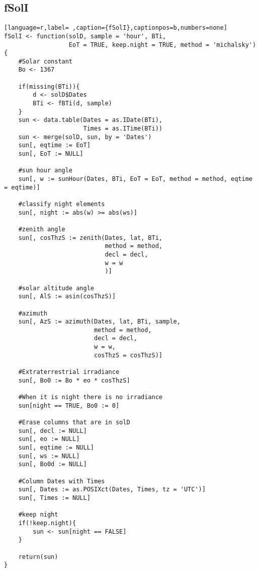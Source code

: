 \subsection{fSolI}
\label{sec:org3740b6e}
\label{subsec:fsoli}
\begin{lstlisting}[language=r,label= ,caption={fSolI},captionpos=b,numbers=none]
fSolI <- function(solD, sample = 'hour', BTi,
                  EoT = TRUE, keep.night = TRUE, method = 'michalsky')
{
    #Solar constant
    Bo <- 1367

    if(missing(BTi)){
        d <- solD$Dates
        BTi <- fBTi(d, sample)
    }
    sun <- data.table(Dates = as.IDate(BTi),
                      Times = as.ITime(BTi))
    sun <- merge(solD, sun, by = 'Dates')
    sun[, eqtime := EoT]
    sun[, EoT := NULL]

    #sun hour angle
    sun[, w := sunHour(Dates, BTi, EoT = EoT, method = method, eqtime = eqtime)]

    #classify night elements
    sun[, night := abs(w) >= abs(ws)]

    #zenith angle
    sun[, cosThzS := zenith(Dates, lat, BTi,
                            method = method,
                            decl = decl,
                            w = w
                            )]

    #solar altitude angle
    sun[, AlS := asin(cosThzS)]

    #azimuth
    sun[, AzS := azimuth(Dates, lat, BTi, sample,
                         method = method,
                         decl = decl, 
                         w = w,
                         cosThzS = cosThzS)]

    #Extraterrestrial irradiance
    sun[, Bo0 := Bo * eo * cosThzS]

    #When it is night there is no irradiance
    sun[night == TRUE, Bo0 := 0]

    #Erase columns that are in solD
    sun[, decl := NULL]
    sun[, eo := NULL]
    sun[, eqtime := NULL]
    sun[, ws := NULL]
    sun[, Bo0d := NULL]

    #Column Dates with Times
    sun[, Dates := as.POSIXct(Dates, Times, tz = 'UTC')]
    sun[, Times := NULL]

    #keep night
    if(!keep.night){
        sun <- sun[night == FALSE]
    }

    return(sun)
}
\end{lstlisting}
